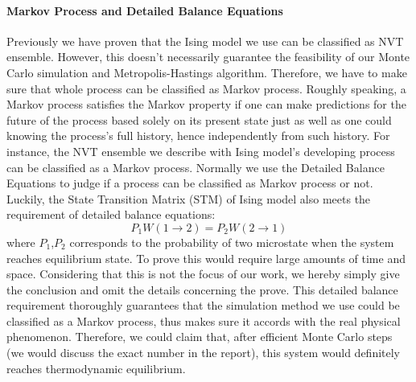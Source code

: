 \documentclass[prl,aps,twocolumn]{revtex4}
\begin{document}
    \paragraph{Markov Process and Detailed Balance Equations} Previously we have proven that the Ising model we use can be classified as NVT ensemble. However, this doesn't necessarily guarantee the feasibility of our Monte Carlo simulation and Metropolis-Hastings algorithm. Therefore, we have to make sure that whole process can be classified as Markov process.
    \indent Roughly speaking, a Markov process satisfies the Markov property if one can make predictions for the future of the process based solely on its present state just as well as one could knowing the process's full history, hence independently from such history. For instance, the NVT ensemble we describe with Ising model's developing process can be classified as a Markov process. Normally we use the Detailed Balance Equations to judge if a process can be classified as Markov process or not. Luckily, the State Transition Matrix (STM) of Ising model also meets the requirement of detailed balance equations:
    \begin{equation}
    P_1W(1\rightarrow2)=P_2W(2\rightarrow1)
    \end{equation}
    where $P_1$,$P_2$ corresponds to the probability of two microstate when the system reaches equilibrium state.
    To prove this would require large amounts of time and space. Considering that this is not the focus of our work, we hereby simply give the conclusion and omit the details concerning the prove.
    \indent This detailed balance requirement thoroughly guarantees that the simulation method we use could be classified as a Markov process, thus makes sure it accords with the real physical phenomenon. Therefore, we could claim that, after efficient Monte Carlo steps (we would discuss the exact number in the report), this system would definitely reaches thermodynamic equilibrium.
\end{document}
